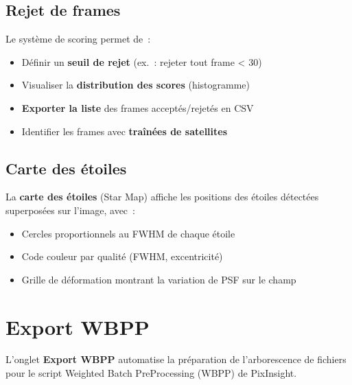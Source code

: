 \documentclass[a4paper,11pt]{article}
\begin{document}
\subsection{Rejet de frames}

Le syst\`{e}me de scoring permet de~:

\begin{itemize}
    \item D\'{e}finir un \textbf{seuil de rejet} (ex.~: rejeter tout frame < 30)
    \item Visualiser la \textbf{distribution des scores} (histogramme)
    \item \textbf{Exporter la liste} des frames accept\'{e}s/rejet\'{e}s en CSV
    \item Identifier les frames avec \textbf{tra\^{i}n\'{e}es de satellites}
\end{itemize}

\subsection{Carte des \'{e}toiles}

La \textbf{carte des \'{e}toiles} (Star Map) affiche les positions des \'{e}toiles d\'{e}tect\'{e}es superpos\'{e}es sur l'image, avec~:

\begin{itemize}
    \item Cercles proportionnels au FWHM de chaque \'{e}toile
    \item Code couleur par qualit\'{e} (FWHM, excentricit\'{e})
    \item Grille de d\'{e}formation montrant la variation de PSF sur le champ
\end{itemize}


\section{Export WBPP}
\label{sec:wbpp}

\begin{tcolorbox}[
    enhanced, colback=successgreen!8, colframe=successgreen!60,
    coltitle=white, fonttitle=\bfseries,
    title={NOUVEAU dans v1.2.0}
]
L'onglet \textbf{Export WBPP} automatise la pr\'{e}paration de l'arborescence de fichiers pour le script Weighted Batch PreProcessing (WBPP) de PixInsight.
\end{tcolorbox}
\end{document}

